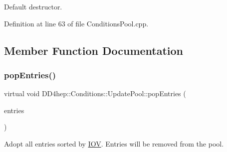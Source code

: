 Default destructor. 



Definition at line 63 of file Conditions\+Pool.\+cpp.



\subsection{Member Function Documentation}
\hypertarget{class_d_d4hep_1_1_conditions_1_1_update_pool_aeb7494e79ae47538aa4f6ca2cb7c4b4d}{}\label{class_d_d4hep_1_1_conditions_1_1_update_pool_aeb7494e79ae47538aa4f6ca2cb7c4b4d} 
\subsubsection{\texorpdfstring{pop\+Entries()}{popEntries()}}
{\footnotesize\ttfamily virtual void D\+D4hep\+::\+Conditions\+::\+Update\+Pool\+::pop\+Entries (\begin{DoxyParamCaption}\item[{\hyperlink{class_d_d4hep_1_1_conditions_1_1_update_pool_a1a578a7a025ded412da474be106dc780}{Update\+Entries} \&}]{entries }\end{DoxyParamCaption})\hspace{0.3cm}{\ttfamily [pure virtual]}}



Adopt all entries sorted by \hyperlink{class_d_d4hep_1_1_i_o_v}{I\+OV}. Entries will be removed from the pool. 

\hypertarget{class_d_d4hep_1_1_conditions_1_1_update_pool_a3cd5432ff682a8da5c9402814a1bd995}{}\label{class_d_d4hep_1_1_conditions_1_1_update_pool_a3cd5432ff682a8da5c9402814a1bd995} 
